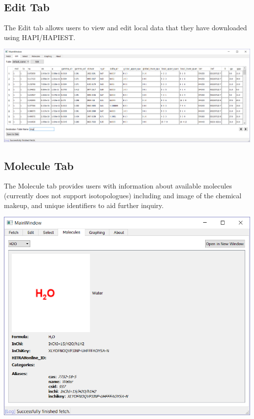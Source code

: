 \documentclass[a0,landscape]{a0poster}
\begin{document}
\begin{multicols}{3}
\subsection*{Edit Tab}
The Edit tab allows users to view and edit local data that they have downloaded using HAPI/HAPIEST.
\begin{center}
\includegraphics[scale = 1]{MainWindow_Edit.png}
\end{center}
\vfill\null
\columnbreak

\subsection*{Molecule Tab}
The Molecule tab provides users with information about available molecules (currently does not support isotopologues) including and image of the chemical makeup, and unique identifiers to aid further inquiry.
\begin{center}
\includegraphics[scale = 1.5]{MainWindow_Molecules.png}
\end{center}


\end{multicols}
\end{document}
